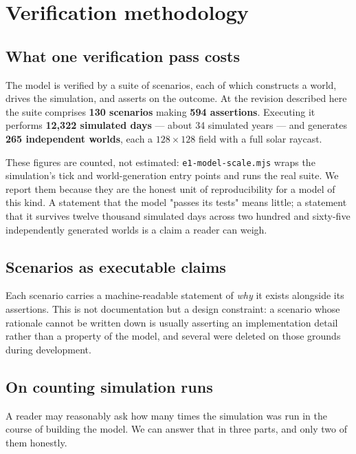 \section{Verification methodology}
\label{sec:verification}

\subsection{What one verification pass costs}

The model is verified by a suite of scenarios, each of which constructs a
world, drives the simulation, and asserts on the outcome. At the revision
described here the suite comprises \textbf{130 scenarios} making \textbf{594
assertions}. Executing it performs \textbf{12{,}322 simulated days} --- about
34 simulated years --- and generates \textbf{265 independent worlds}, each a
$128\times128$ field with a full solar raycast.

These figures are counted, not estimated: \texttt{e1-model-scale.mjs} wraps the
simulation's tick and world-generation entry points and runs the real suite.
We report them because they are the honest unit of reproducibility for a model
of this kind. A statement that the model "passes its tests" means little; a
statement that it survives twelve thousand simulated days across two hundred
and sixty-five independently generated worlds is a claim a reader can weigh.

\subsection{Scenarios as executable claims}

Each scenario carries a machine-readable statement of \emph{why} it exists
alongside its assertions. This is not documentation but a design constraint: a
scenario whose rationale cannot be written down is usually asserting an
implementation detail rather than a property of the model, and several were
deleted on those grounds during development.

\subsection{On counting simulation runs}

A reader may reasonably ask how many times the simulation was run in the course
of building the model. We can answer that in three parts, and only two of them
honestly.

